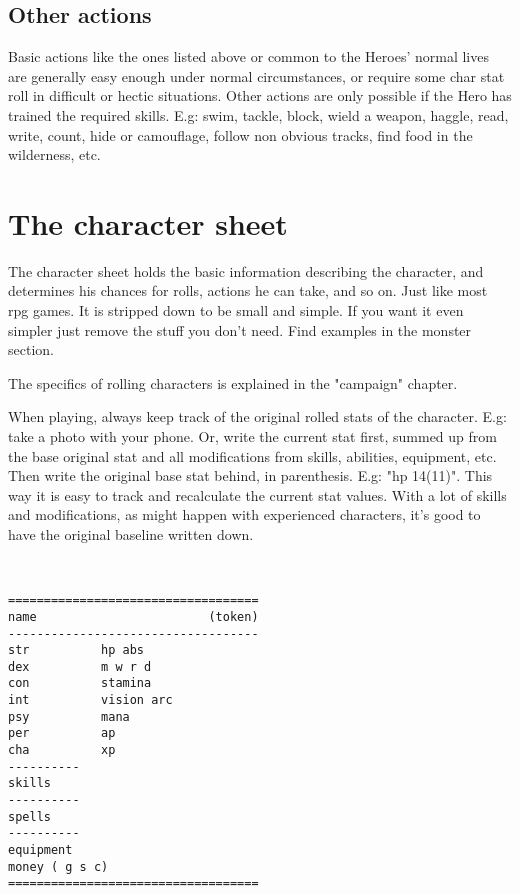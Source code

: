 \subsection*{Other actions}
Basic actions like the ones listed above or common to the Heroes' normal lives are generally easy enough under normal circumstances, or require some char stat roll in difficult or hectic situations. Other actions are only possible if the Hero has trained the required skills. E.g: swim, tackle, block, wield a weapon, haggle, read, write, count, hide or camouflage, follow non obvious tracks, find food in the wilderness, etc.













\section*{The character sheet}
\label{sec:charsheet}

The character sheet holds the basic information describing the character, and determines his chances for rolls, actions he can take, and so on. Just like most rpg games. It is stripped down to be small and simple. If you want it even simpler just remove the stuff you don't need. Find examples in the monster section.

The specifics of rolling characters is explained in the "campaign" chapter.

When playing, always keep track of the original rolled stats of the character. E.g: take a photo with your phone. Or, write the current stat first, summed up from the base original stat and all modifications from skills, abilities, equipment, etc. Then write the original base stat behind, in parenthesis. E.g: "hp 14(11)". This way it is easy to track and recalculate the current stat values. With a lot of skills and modifications, as might happen with experienced characters, it's good to have the original baseline written down.

\

\goodbreak
\begin{samepage} \begin{verbatim}
===================================
name                        (token)
-----------------------------------
str          hp abs
dex          m w r d
con          stamina
int          vision arc
psy          mana
per          ap
cha          xp
----------
skills
----------
spells
----------
equipment
money ( g s c)
===================================
\end{verbatim} \end{samepage}


